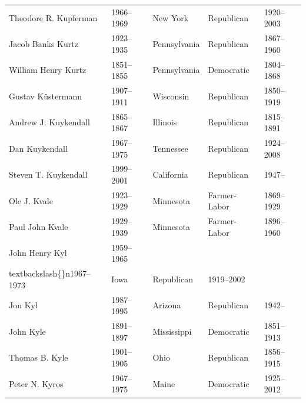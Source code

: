 \documentclass{article}
\begin{document}
\begin{tabular}{lllll}
Theodore R. Kupferman & 1966–1969 & New York & Republican & 1920–2003 \\
Jacob Banks Kurtz & 1923–1935 & Pennsylvania & Republican & 1867–1960 \\
William Henry Kurtz & 1851–1855 & Pennsylvania & Democratic & 1804–1868 \\
Gustav Küstermann & 1907–1911 & Wisconsin & Republican & 1850–1919 \\
Andrew J. Kuykendall & 1865–1867 & Illinois & Republican & 1815–1891 \\
Dan Kuykendall & 1967–1975 & Tennessee & Republican & 1924–2008 \\
Steven T. Kuykendall & 1999–2001 & California & Republican & 1947– \\
Ole J. Kvale & 1923–1929 & Minnesota & Farmer-Labor & 1869–1929 \\
Paul John Kvale & 1929–1939 & Minnesota & Farmer-Labor & 1896–1960 \\
John Henry Kyl & 1959–1965\\textbackslash\{\}n1967–1973 & Iowa & Republican & 1919–2002 \\
Jon Kyl & 1987–1995 & Arizona & Republican & 1942– \\
John Kyle & 1891–1897 & Mississippi & Democratic & 1851–1913 \\
Thomas B. Kyle & 1901–1905 & Ohio & Republican & 1856–1915 \\
Peter N. Kyros & 1967–1975 & Maine & Democratic & 1925–2012 \\
\bottomrule
\end{tabular}
\end{document}
